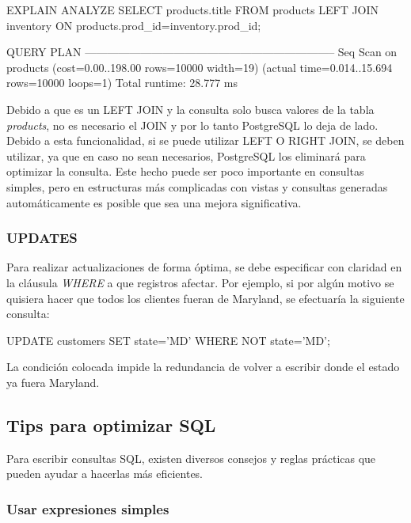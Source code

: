 \begin{pyglist}
EXPLAIN ANALYZE SELECT products.title FROM products LEFT JOIN inventory
ON products.prod_id=inventory.prod_id;

    QUERY PLAN                                                  
--------------------------------------------------------------------
 Seq Scan on products  (cost=0.00..198.00 rows=10000 width=19)
                      (actual time=0.014..15.694 rows=10000 loops=1)
 Total runtime: 28.777 ms
\end{pyglist}

Debido a que es un LEFT JOIN y la consulta solo busca valores de la tabla \textit{products}, no es necesario el JOIN y por lo tanto PostgreSQL lo deja de lado.\\

Debido a esta funcionalidad, si se puede utilizar LEFT O RIGHT JOIN, se deben utilizar, ya que en caso no sean necesarios, PostgreSQL los eliminará para optimizar la consulta. Este hecho puede ser poco importante en consultas simples, pero en estructuras más complicadas con vistas y consultas generadas automáticamente es posible que sea una mejora significativa.

\subsubsection{UPDATES}

Para realizar actualizaciones de forma óptima, se debe especificar con claridad en la cláusula \textit{WHERE} a que registros afectar. Por ejemplo, si por algún motivo se quisiera hacer que todos los clientes fueran de Maryland, se efectuaría la siguiente consulta:\\

\begin{pyglist}
UPDATE customers SET state='MD' WHERE NOT state='MD';
\end{pyglist}

La condición colocada impide la redundancia de volver a escribir donde el estado ya fuera Maryland.

\subsection{Tips para optimizar SQL}

Para escribir consultas SQL, existen diversos consejos y reglas prácticas que pueden ayudar a hacerlas más eficientes.

\subsubsection{Usar expresiones simples}

